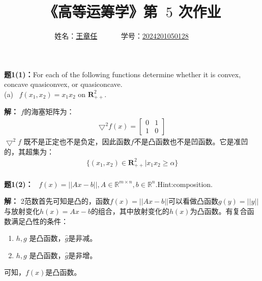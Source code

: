 \documentclass[12pt,a4paper]{article}
\begin{document}
\title{
{\heiti《高等运筹学》第~{$5$} 次作业
}
}
\date{}

\author{
	姓名：\underline{王章任}~~~~~~
	学号：\underline{2024201050128}~~~~~~}

\maketitle

\noindent
{\bf 题1(1)：}For each of the following functions determine whether it is convex, concave quasiconvex, or quasiconcave.\\
(a)~ \(f(x_1,x_2)=x_1x_2\) on \(\mathbf{R}_{++}^2\).

\vspace{5pt}
\noindent
{\bf 解：}
\(f\)的海塞矩阵为：
\begin{align*}
    \mathbf{\bigtriangledown} ^2f(x)=
    \begin{bmatrix} 
        0 & 1\\
        1 & 0 
    \end{bmatrix} 
\end{align*}
\(\bigtriangledown ^2f\) 既不是正定也不是负定，因此函数\(f\)不是凸函数也不是凹函数。它是准凹的，其超集为：
\begin{align*}
    \{(x_1,x_2) \in \mathbf{R}_{++}^2 | x_1x_2 \geq \alpha\}
\end{align*}
\\

\vspace{5pt}
\noindent
{\bf 题1(2)：}~ \(f(x)=||Ax-b||,A \in \mathbb{R}^{m\times n} ,b \in \mathbb{R}^n\).Hint:composition.

\vspace{5pt}
\noindent
{\bf 解：}
2范数首先可知是凸的，函数\(f(x)=||Ax-b||\)可以看做凸函数\(g(y)=||y||\)与放射变化\(h(x)=Ax-b\)的组合，其中放射变化的\(h(x)\)为凸函数。有复合函数满足凸性的条件：
\begin{enumerate}
    \item \(h,g\) 是凸函数，\(\hat{g}\)是非减。
    \item \(h,g\) 是凸函数，\(\hat{g}\)是非增。
\end{enumerate}
可知，\(f(x)\)是凸函数。\\
\end{document}
